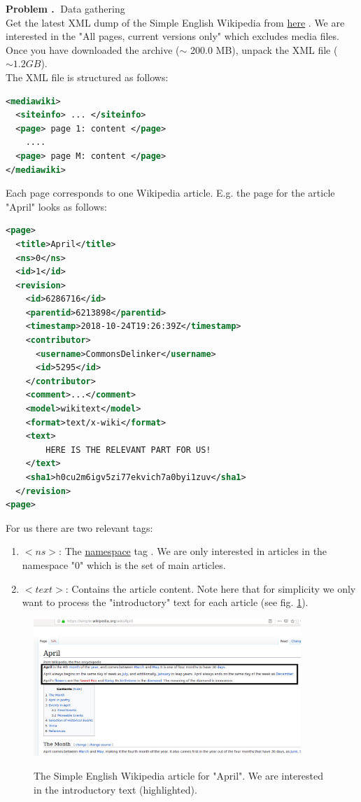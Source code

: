 \documentclass[10pt]{article}
\newcounter{problemCounter}
\newenvironment{problem}[1]
{
	\vspace{0.5cm}
	\refstepcounter{problemCounter}\label{#1}
	\noindent \textbf{Problem \theproblemCounter.$\;$} 
}{}
\begin{document}
\begin{problem}
	DData gathering \\
	Get the latest XML dump of the Simple English Wikipedia from  \href{https://dumps.wikimedia.org/simplewiki/20181120/}{here} \cite{url:sew-dump}. We are interested in the "All pages, current versions only" which excludes media files. Once you have downloaded the archive ($\sim$ 200.0 MB), unpack the XML file ($\sim 1.2 GB$).
\end{problem} \\
The XML file is structured as follows:
\begin{lstlisting}[language=XML]
<mediawiki>
  <siteinfo> ... </siteinfo>
  <page> page 1: content </page>
    ....
  <page> page M: content </page>
</mediawiki>
\end{lstlisting}
Each page corresponds to one Wikipedia article. E.g. the page for the article "April" looks as follows:
\begin{lstlisting}[language=XML]
<page>
  <title>April</title>
  <ns>0</ns>
  <id>1</id>
  <revision>
    <id>6286716</id>
    <parentid>6213898</parentid>
    <timestamp>2018-10-24T19:26:39Z</timestamp>
    <contributor>
      <username>CommonsDelinker</username>
      <id>5295</id>
    </contributor>
    <comment>...</comment>
    <model>wikitext</model>
    <format>text/x-wiki</format>
    <text>
        HERE IS THE RELEVANT PART FOR US!
    </text>
    <sha1>h0cu2m6igv5zi77ekvich7a0byi1zuv</sha1>
  </revision>
<page>
\end{lstlisting}
For us there are two relevant tags:
\begin{enumerate}
  \item $<ns>$: The \href{https://en.wikipedia.org/wiki/Wikipedia:Namespace}{namespace} tag \cite{url:wiki-ns}. We are only interested in articles in the namespace "$0$" which is the set of main articles.
  \item $<text>$: Contains the article content. Note here that for simplicity we only want to process the "introductory" text for each article (see fig. \ref{fig:article_intro}).
\end{enumerate}

\begin{figure}
	\includegraphics[width=0.9\textwidth]{article_intro.png}
	\label{fig:article_intro}
	\caption{The Simple English Wikipedia article for "April". We are interested in the introductory text (highlighted).}
\end{figure}
\end{document}
